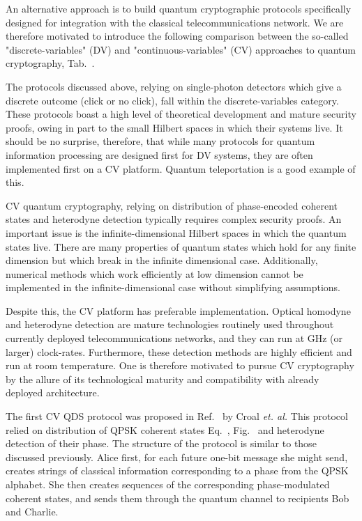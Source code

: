 An alternative approach is to build quantum cryptographic protocols specifically designed for integration with the classical telecommunications network. We are therefore motivated to introduce the following comparison between the so-called "discrete-variables" (DV) and "continuous-variables" (CV) approaches to quantum cryptography, Tab.~.  

The protocols discussed above, relying on single-photon detectors which give a discrete outcome (click or no click), fall within the discrete-variables category. These protocols boast a high level of theoretical development and mature security proofs, owing in part to the small Hilbert spaces in which their systems live. It should be no surprise, therefore, that while many protocols for quantum information processing are designed first for DV systems, they are often implemented first on a CV platform. Quantum teleportation is a good example of this. 

CV quantum cryptography, relying on distribution of phase-encoded coherent states and heterodyne detection typically requires complex security proofs. An important issue is the infinite-dimensional Hilbert spaces in which the quantum states live. There are many properties of quantum states which hold for any finite dimension but which break in the infinite dimensional case.  Additionally, numerical methods which work efficiently at low dimension  cannot be implemented in the infinite-dimensional case without simplifying assumptions.

Despite this, the CV platform has preferable implementation.  Optical homodyne and heterodyne detection are mature technologies routinely used throughout currently deployed telecommunications networks, and they can run at GHz (or larger) clock-rates. Furthermore, these detection methods are highly efficient  and run at room temperature. One is therefore motivated to pursue CV cryptography by the allure of its technological maturity and compatibility with already deployed architecture. 

The first CV QDS protocol was proposed in Ref.~\cite{Croal2016} by Croal \emph{et. al.} This protocol relied on distribution of QPSK coherent states Eq.~, Fig.~ and heterodyne detection of their phase. The structure of the protocol is similar to those discussed previously. Alice first, for each future one-bit message she might send, creates strings of classical information corresponding to a phase from the QPSK alphabet. She then creates sequences of the corresponding phase-modulated coherent states, and sends them through the quantum channel to recipients Bob and Charlie.

